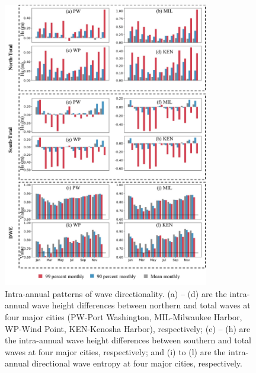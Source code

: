 \begin{figure}[htbp]
  \centering
  \includegraphics[width=0.8\textwidth]{chapter3/resources/figure3-6.jpg}
  \caption{Intra-annual patterns of wave directionality. (a) – (d) are the intra-annual wave height differences between northern and total waves at four major cities (PW-Port Washington, MIL-Milwaukee Harbor, WP-Wind Point, KEN-Kenosha Harbor), respectively; (e) – (h) are the intra-annual wave height differences between southern and total waves at four major cities, respectively; and (i) to (l) are the intra-annual directional wave entropy at four major cities, respectively.}
  \label{fig:fig3.6}
\end{figure}

